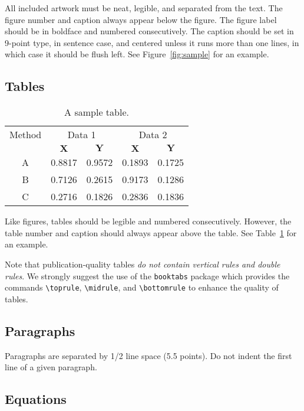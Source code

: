 \documentclass{article}
\begin{document}
All included artwork must be neat, legible, and separated from the text.
The figure number and caption always appear below the figure.
The figure label should be in boldface and numbered consecutively.
The caption should be set in 9-point type, in sentence case, and centered unless it runs more than one lines, in which case it should be flush left.
See Figure~\ref{fig:sample} for an example.

\subsection{Tables}

\begin{table}
	\centering
	\caption{A sample table.}
	\label{tab:sample}
	\begin{tabular}{ccccc}
		\toprule
		\multirow{2.5}{*}{Method} & \multicolumn{2}{c}{Data 1} & \multicolumn{2}{c}{Data 2}  \\
		\cmidrule(lr){2-3} \cmidrule(lr){4-5}
		& \(\mathbf{X}\) & \(\mathbf{Y}\) & \(\mathbf{X}\) & \(\mathbf{Y}\) \\
		\midrule
		A & 0.8817  & 0.9572 & 0.1893 & 0.1725 \\
		B & 0.7126  & 0.2615 & 0.9173 & 0.1286 \\
		C & 0.2716  & 0.1826 & 0.2836 & 0.1836 \\
		\bottomrule
	\end{tabular}
\end{table}

Like figures, tables should be legible and numbered consecutively.
However, the table number and caption should always appear above the table.
See Table~\ref{tab:sample} for an example.

Note that publication-quality tables \emph{do not contain vertical rules and double rules}.
We strongly suggest the use of the \texttt{booktabs} package which provides the commands \verb+\toprule+, \verb+\midrule+, and \verb+\bottomrule+ to enhance the quality of tables.

\subsection{Paragraphs}

Paragraphs are separated by 1/2 line space (5.5 points).
Do not indent the first line of a given paragraph.

\subsection{Equations}
\end{document}

